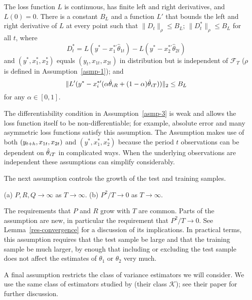 \documentclass[12pt]{article}
\begin{document}
\begin{asmp}\label{asmp-3}
  The loss function $L$ is continuous, has finite left and right
  derivatives, and $L(0) = 0$.  There is a constant $B_L$ and a
  function $L'$ that bounds the left and right derivative of $L$ at
  every point such that $\|D_t\|_\rho \leq B_L$; $\|D_t^*\|_\rho \leq
  B_L$ for all $t$, where
  \begin{equation*}
    D_t^* = L(y^* - x_1^{*\prime}\hat\theta_{1t})
    - L(y^* - x_2^{*\prime}\hat\theta_{2t})
  \end{equation*}
  and $(y^*, x_1^*, x_2^*)$ equals $(y_t, x_{1t}, x_{2t})$ in
  distribution but is independent of $\mathcal{F}_T$ ($\rho$ is defined
  in Assumption~\ref{asmp-1}); and
  \begin{equation*}
    \| L'(y^* - x_{i}^{*\prime} (\alpha \hat\theta_{iR} + (1-\alpha) \hat\theta_{iT})) \|_2
    \leq B_L
  \end{equation*}
  for any $\alpha \in [0,1]$.
\end{asmp}

The differentiability condition in Assumption~\ref{asmp-3} is weak and
allows the loss function itself to be non-differentiable; for example,
absolute error and many asymmetric loss functions satisfy this
assumption. The Assumption makes use of both $(y_{t+h}, x_{1t},
x_{2t})$ and $(y^*, x_1^*, x_2^*)$ because the period $t$ observations
can be dependent on $\hat\theta_{iT}$ in complicated ways. When the underlying
observations are independent these assumptions can simplify
considerably.

The next assumption controls the growth of the test and
training samples.
\begin{asmp} \label{asmp-4} (a) $P, R, Q \to\infty$ as $T \to
  \infty$. (b) $P^2/T \to 0$ as $T \to \infty$.
\end{asmp}

The requirements that $P$ and $R$ grow with $T$ are common. Parts of
the assumption are new, in particular the requirement that $P^2/T \to
0$.  See Lemma~\ref{res-convergence} for a discussion of its
implications.  In practical terms, this assumption requires that the
test sample be large and that the training sample be much larger, by
enough that including or excluding the test sample does not affect the
estimates of $\theta_1$ or $\theta_2$ very much.

A final assumption restricts the class of variance estimators we will
consider.  We use the same class of estimators studied by
\citet{JoD:00} (their class $\mathcal{K}$); see
their paper for further discussion.
\end{document}
